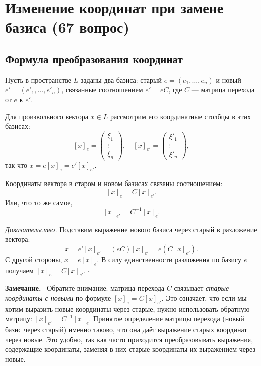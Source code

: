 \documentclass[a4paper,12pt]{article}
\newcommand{\myremark}{\textbf{Замечание.}\ }
\theoremstyle{definition}
\theoremstyle{plain}
\theoremstyle{remark}
\begin{document}
	\section{Изменение координат при замене базиса (67 вопрос)}
	
	\subsection{Формула преобразования координат}
	
	Пусть в пространстве \( L \) заданы два базиса: старый \( e = (e_1, \dots, e_n) \) и новый \( e' = (e'_1, \dots, e'_n) \), связанные соотношением \( e' = e C \), где \( C \) — матрица перехода от \( e \) к \( e' \).
	
	Для произвольного вектора \( x \in L \) рассмотрим его координатные столбцы в этих базисах:
	\[
	[x]_e = \begin{pmatrix} \xi_1 \\ \vdots \\ \xi_n \end{pmatrix}, \quad [x]_{e'} = \begin{pmatrix} \xi'_1 \\ \vdots \\ \xi'_n \end{pmatrix},
	\]
	так что \( x = e [x]_e = e' [x]_{e'} \).
	
	\begin{tcolorbox}[colback=blue!5, colframe=blue!40!black, title=Теорема (Формула преобразования координат)]
		Координаты вектора в старом и новом базисах связаны соотношением:
		\[
		[x]_e = C [x]_{e'}.
		\]
		Или, что то же самое,
		\[
		[x]_{e'} = C^{-1} [x]_e.
		\]
	\end{tcolorbox}
	
	\medskip
	\textit{Доказательство.}
	Подставим выражение нового базиса через старый в разложение вектора:
	\[
	x = e' [x]_{e'} = (e C) [x]_{e'} = e (C [x]_{e'}).
	\]
	С другой стороны, \( x = e [x]_e \). В силу единственности разложения по базису \( e \) получаем \( [x]_e = C [x]_{e'} \). \hfill \(\square\)
	
	\myremark
	Обратите внимание: матрица перехода \( C \) связывает \textit{старые координаты с новыми} по формуле \( [x]_e = C [x]_{e'} \). Это означает, что если мы хотим выразить новые координаты через старые, нужно использовать обратную матрицу: \( [x]_{e'} = C^{-1} [x]_e \). Принятое определение матрицы перехода (новый базис через старый) именно таково, что она даёт выражение старых координат через новые. Это удобно, так как часто приходится преобразовывать выражения, содержащие координаты, заменяя в них старые координаты их выражением через новые.
	
\end{document}
